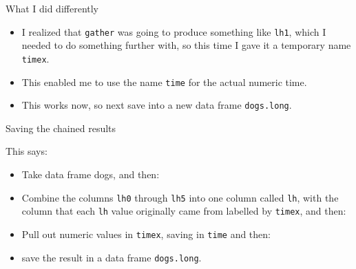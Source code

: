 \begin{frame}[fragile]{What I did differently}
  
  \begin{itemize}
  \item I realized that \texttt{gather} was going to produce something
    like \texttt{lh1}, which I needed to do something further with, so
    this time I gave it a temporary name \texttt{timex}.
  \item This enabled me to use the name \texttt{time} for the actual
    numeric time.
  \item This works now, so next save into a new data frame \texttt{dogs.long}.
  \end{itemize}
  
\end{frame}

\begin{frame}[fragile]{Saving the chained results}
  

\begin{knitrout}
\color{fgcolor}
\end{knitrout}

This says:

\begin{itemize}
\item Take data frame dogs, and then:
\item Combine the columns \texttt{lh0} through \texttt{lh5} into one
  column called \texttt{lh}, with the column that each \texttt{lh}
  value originally came from labelled by \texttt{timex}, and then:
\item Pull out numeric values in \texttt{timex}, saving in \texttt{time} and then:
\item save the result in a data frame \texttt{dogs.long}.
\end{itemize}
  
\end{frame}

